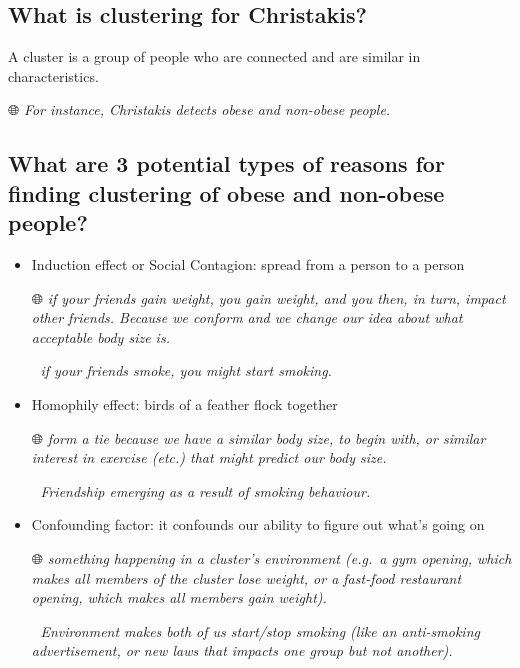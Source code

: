 \documentclass[
  notitlepage,
  onecolumn,
  openany]{book}
\begin{document}
\hypertarget{what-is-clustering-for-christakis}{%
\subsection{What is clustering for Christakis?}\label{what-is-clustering-for-christakis}}

A cluster is a group of people who are connected and are similar in characteristics.

🌐 \emph{For instance, Christakis detects obese and non-obese people.}

\hypertarget{what-are-3-potential-types-of-reasons-for-finding-clustering-of-obese-and-non-obese-people}{%
\subsection{What are 3 potential types of reasons for finding clustering of obese and non-obese people?}\label{what-are-3-potential-types-of-reasons-for-finding-clustering-of-obese-and-non-obese-people}}

\begin{itemize}
\item
  Induction effect or Social Contagion: spread from a person to a person

  🌐 \emph{if your friends gain weight, you gain weight, and you then, in turn, impact other friends. Because we conform and we change our idea about what acceptable body size is.}

  🚬 \emph{if your friends smoke, you might start smoking.}
\item
  Homophily effect: birds of a feather flock together

  🌐 \emph{form a tie because we have a similar body size, to begin with, or similar interest in exercise (etc.) that might predict our body size.}

  🚬 \emph{Friendship emerging as a result of smoking behaviour.}
\item
  Confounding factor: it confounds our ability to figure out what's going on

  🌐 \emph{something happening in a cluster's environment (e.g.~a gym opening, which makes all members of the cluster lose weight, or a fast-food restaurant opening, which makes all members gain weight).}

  🚬 \emph{Environment makes both of us start/stop smoking (like an anti-smoking advertisement, or new laws that impacts one group but not another).}
\end{itemize}
\end{document}
